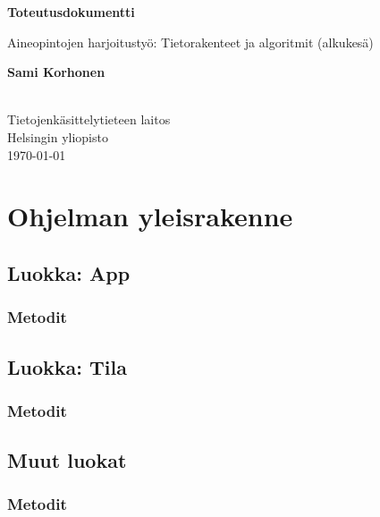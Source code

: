 \documentclass[a4paper,12pt, titlepage]{article}
\begin{document}
\begin{titlepage}
    \begin{center}
        \vspace*{1cm}
        
        \LARGE
        \textbf{Toteutusdokumentti}
        
        \vspace{0.5cm}
        \Large
        Aineopintojen harjoitustyö: Tietorakenteet ja algoritmit (alkukesä)
        
        \vspace{1.5cm}
        
        \large
        \textbf{Sami Korhonen} \\
         \\
        
		\vfill        
        \normalsize
        Tietojenkäsittelytieteen laitos\\
        Helsingin yliopisto\\
		\large        
        \today
        
    \end{center}
\end{titlepage}



\section*{Ohjelman yleisrakenne}
\subsection*{Luokka: App}
\subsubsection*{Metodit}
\subsection*{Luokka: Tila}
\subsubsection*{Metodit}
\subsection*{Muut luokat}
\subsubsection*{Metodit}
\end{document}

